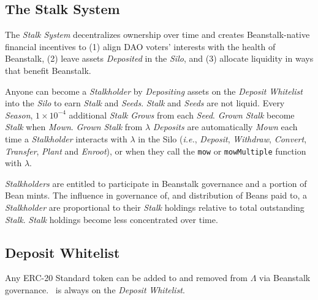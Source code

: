 \documentclass[tikz]{article}
\newcommand{\code}[1]{\texttt{#1}}
\newcommand{\term}[1]{\textsl{#1}}
\newcommand{\Bean}{} %
\begin{document}
\vspace*{-1.3mm}
\subsection{The Stalk System}
\vspace*{-1.3mm}
The \term{Stalk System} decentralizes ownership over time and creates Beanstalk-native financial incentives to (1) align DAO voters' interests with the health of Beanstalk, (2) leave assets \term{Deposited} in the \term{Silo}, and (3) allocate liquidity in ways that benefit Beanstalk.

Anyone can become a \term{Stalkholder} by \term{Depositing} assets on the \term{Deposit} \term{Whitelist} into the \term{Silo} to earn \term{Stalk} and \term{Seeds}. \term{Stalk} and \term{Seeds} are not liquid. Every \term{Season}, $1 \times 10^{-4}$ additional \term{Stalk} \term{Grows} from each \term{Seed}. \term{Grown} \term{Stalk} become \term{Stalk} when \term{Mown}. \term{Grown} \term{Stalk} from \hyperlink{ht126}{$\lambda$} \term{Deposits} are automatically \term{Mown} each time a \term{Stalkholder} interacts with \hyperlink{ht126}{$\lambda$} in the Silo (\term{i.e.}, \term{Deposit}, \term{Withdraw}, \term{Convert}, \term{Transfer}, \term{Plant} and \term{Enroot}), or when they call the \code{mow} or \code{mowMultiple} function with \hyperlink{ht126}{$\lambda$}.

\term{Stalkholders} are entitled to participate in Beanstalk governance and a portion of Bean mints. The influence in governance of, and distribution of Beans paid to, a \term{Stalkholder} are proportional to their \term{Stalk} holdings relative to total outstanding \term{Stalk}. \term{Stalk} holdings become less concentrated over time.

\vspace*{-1.3mm}
\subsection{Deposit Whitelist}
\vspace*{-1.3mm}
Any ERC-20 Standard token can be added to and removed from \hyperlink{ht127}{$\Lambda$} via Beanstalk governance. \Bean\ is always on the \term{Deposit} \term{Whitelist}.
\end{document}
